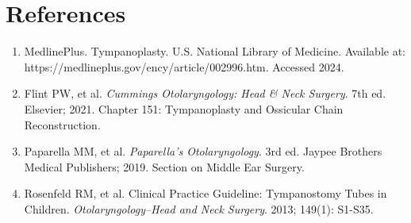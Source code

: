 \section*{References}
\begin{enumerate}
  \item MedlinePlus. Tympanoplasty. U.S. National Library of Medicine. Available at: https://medlineplus.gov/ency/article/002996.htm. Accessed 2024.
  
  \item Flint PW, et al. {\em Cummings Otolaryngology: Head \& Neck Surgery}. 7th ed. Elsevier; 2021. Chapter 151: Tympanoplasty and Ossicular Chain Reconstruction.
  
  \item Paparella MM, et al. {\em Paparella's Otolaryngology}. 3rd ed. Jaypee Brothers Medical Publishers; 2019. Section on Middle Ear Surgery.
  
  \item Rosenfeld RM, et al. Clinical Practice Guideline: Tympanostomy Tubes in Children. {\em Otolaryngology–Head and Neck Surgery}. 2013; 149(1): S1-S35.
\end{enumerate}

\clearpage

